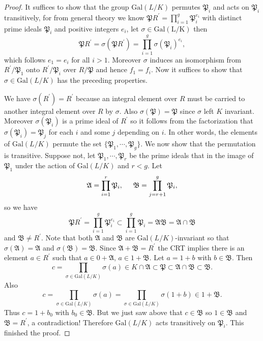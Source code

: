 \begin{proof}
It suffices to show that the group $\mathrm{Gal}(L/K)$ permutes $\mathfrak{P}_i$ and acts on $\mathfrak{P}_i$ transitively, for from general theory we know $\mathfrak{P} R^{\prime}=\prod_{i=1}^g{\mathfrak{P} _{i}^{e_i}}$ with distinct prime ideals $\mathfrak{P}_i$ and positive integers $e_i$, let $\sigma\in\mathrm{Gal(L/K)}$ then 
$$
\mathfrak{P} R^{\prime}=\sigma \left( \mathfrak{P} R^{\prime} \right) =\prod_{i=1}^g{\sigma \left( \mathfrak{P} _i \right) ^{e_i}},
$$
which follows $e_1=e_i$ for all $i>1$. Moreover $\sigma$ induces an isomorphism from $R^\prime/\mathfrak{P}_1$ onto $R^\prime/\mathfrak{P}_i$ over $R/\mathfrak{P}$ and hence $f_1=f_i$. Now it suffices to show that $\sigma\in\mathrm{Gal}(L/K)$ has the preceding properties.\par
We have $\sigma(R^\prime)=R^\prime$ because an integral element over $R$ must be carried to another integral element over $R$ by $\sigma$. Also $\sigma(\mathfrak{P})=\mathfrak{P}$ since $\sigma$ left $K$ invariant. Moreover $\sigma(\mathfrak{P}_i)$ is a prime ideal of $R^\prime$ so it follows from the factorization that $\sigma(\mathfrak{P}_i)=\mathfrak{P}_j$ for each $i$ and some $j$ depending on $i$. In other words, the elements of $\mathrm{Gal}(L/K)$ permute the set $\{\mathfrak{P}_1,\cdots,\mathfrak{P}_g\}$. We now show that the permutation is transitive. Suppose not, let $\mathfrak{P}_1,\cdots,\mathfrak{P}_r$ be the prime ideals that in the image of $\mathfrak{P}_1$ under the action of $\mathrm{Gal}(L/K)$ and $r<g$. Let 
$$
\mathfrak{A} =\prod_{i=1}^r{\mathfrak{P} _i},\hspace{0.5cm}\mathfrak{B} =\prod_{j=r+1}^g{\mathfrak{P} _i},
$$
so we have 
$$
\mathfrak{P} R^{\prime}=\prod_{i=1}^g{\mathfrak{P} _{i}^{e_i}}\subset \prod_{i=1}^g{\mathfrak{P} _i}=\mathfrak{A} \mathfrak{B} =\mathfrak{A} \cap \mathfrak{B} 
$$
and $\mathfrak{B}\ne R^\prime$. Note that both $\mathfrak{A}$ and $\mathfrak{B}$ are $\mathrm{Gal}(L/K)$-invariant so that $\sigma(\mathfrak{A})=\mathfrak{A}$ and $\sigma(\mathfrak{B})=\mathfrak{B}$. Since $\mathfrak{A}+\mathfrak{B}=R^\prime$ the CRT implies there is an element $a\in R^\prime$ such that $a\in 0+\mathfrak{A}$, $a\in 1+\mathfrak{B}$. Let $a=1+b$ with $b\in\mathfrak{B}$. Then 
$$
c=\prod_{\sigma \in \mathrm{Gal}\left( L/K \right)}{\sigma \left( a \right)}\in K\cap \mathfrak{A} \subset \mathfrak{P} \subset \mathfrak{A} \cap \mathfrak{B} \subset \mathfrak{B} .
$$
Also 
$$
c=\prod_{\sigma \in \mathrm{Gal}\left( L/K \right)}{\sigma \left( a \right)}=\prod_{\sigma \in \mathrm{Gal}\left( L/K \right)}{\sigma \left( 1+b \right)}\in 1+\mathfrak{B} .
$$
Thus $c=1+b_0$ with $b_0\in\mathfrak{B}$. But we just saw above that $c\in\mathfrak{B}$ so $1\in\mathfrak{B}$ and $\mathfrak{B}=R^\prime$, a contradiction! Therefore $\mathrm{Gal}(L/K)$ acts transitively on $\mathfrak{P}_i$. This finished the proof.
\end{proof}
